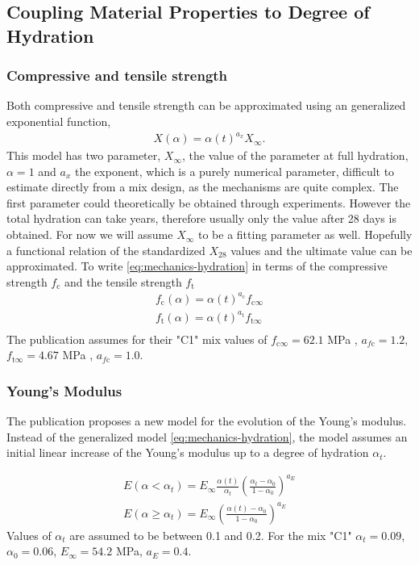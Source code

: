 \subsection{Coupling Material Properties to Degree of Hydration}
\subsubsection{Compressive and tensile strength}
Both compressive and tensile strength can be approximated using an generalized exponential function,
\begin{align}
	X(\alpha) = \alpha(t)^{a_x} X_\infty. \label{eq:mechanics-hydration}
\end{align}
This model has two parameter, $X_\infty$, the value of the parameter at full hydration, $\alpha = 1$ and $a_x$ the exponent, which is a purely numerical parameter, difficult to estimate directly from a mix design, as the mechanisms are quite complex.
The first parameter could theoretically be obtained through experiments.
However the total hydration can take years, therefore usually only the value after 28 days is obtained.
For now we will assume $X_\infty$ to be a fitting parameter as well.
Hopefully a functional relation of the standardized $X_28$ values and the ultimate value can be approximated.
To write \eqref{eq:mechanics-hydration} in terms of the compressive strength $f_{\text{c}}$ and the tensile strength $f_{\text{t}}$
\begin{align}
	f_{\text{c}}(\alpha) = \alpha(t)^{a_{\text{c}}} f_{\text{c}\infty}\\
	f_{\text{t}}(\alpha) = \alpha(t)^{a_{\text{t}}} f_{\text{t}\infty}\\
\end{align}
The publication assumes for their "C1" mix values of  $f_{\text{c}\infty} = 62.1$ MPa , $a_{f\text{c}} = 1.2$,$f_{\text{t}\infty} = 4.67$ MPa , $a_{f\text{c}} = 1.0$.

\subsubsection{Young's Modulus}
The publication proposes a new model for the evolution of the Young's modulus.
Instead of the generalized model \eqref{eq:mechanics-hydration}, the model assumes an initial linear increase of the Young's modulus up to a degree of hydration $\alpha_t$.

\begin{align}
	E(\alpha < \alpha_t) = E_\infty  \frac{\alpha(t)}{\alpha_t}\left( \frac{\alpha_t-\alpha_0}{1-\alpha_0}\right)^{a_E}  \\
	E(\alpha \ge \alpha_t) = E_\infty  \left( \frac{\alpha(t)-\alpha_0}{1-\alpha_0}\right)^{a_E}  
\end{align}
Values of $\alpha_t$ are assumed to be between 0.1 and 0.2.
For the mix "C1" $\alpha_t = 0.09$, $\alpha_0 = 0.06$, $E_\infty = 54.2$ MPa, $a_E = 0.4$.






